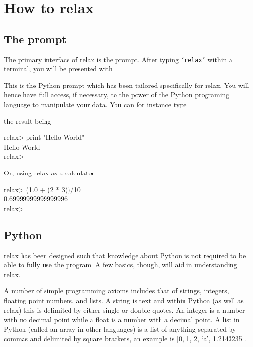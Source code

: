 
\chapter{How to relax}



\section{The prompt}

The primary interface of relax is the prompt.  After typing \texttt{`relax'} within a terminal, you will be presented with


This is the Python prompt which has been tailored specifically for relax.  You will hence have full access, if necessary, to the power of the Python programing language to manipulate your data.  You can for instance type


the result being

\begin{exampleenv}
relax> print "Hello World" \\
Hello World \\
relax> \\
\end{exampleenv}

Or, using relax as a calculator

\begin{exampleenv}
relax> (1.0 + (2 * 3))/10 \\
0.69999999999999996 \\
relax> \\
\end{exampleenv}




\section{Python}

relax has been designed such that knowledge about Python is not required to be able to fully use the program.  A few basics, though, will aid in understanding relax.

A number of simple programming axioms includes that of strings, integers, floating point numbers, and lists.  A string is text and within Python (as well as relax) this is delimited by either single or double quotes.  An integer is a number with no decimal point while a float is a number with a decimal point.  A list in Python (called an array in other languages) is a list of anything separated by commas and delimited by square brackets, an example is [0, 1, 2, `a', 1.2143235].

